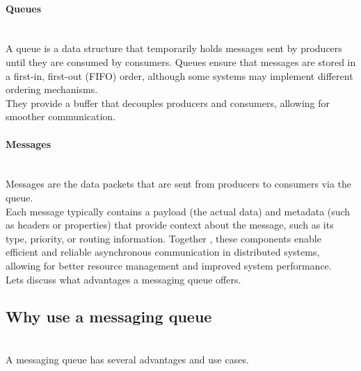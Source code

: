 \paragraph{Queues}\label{Queues}
\\
A queue is a data structure that temporarily holds messages sent by producers until they are consumed by consumers. Queues ensure that messages are stored in a first-in, first-out (FIFO) order, although some systems may implement different ordering mechanisms.
\\
They provide a buffer that decouples producers and consumers, allowing for smoother communication.
\\
\paragraph{Messages}\label{Messages}
\\
Messages are the data packets that are sent from producers to consumers via the queue.
\\
Each message typically contains a payload (the actual data) and metadata (such as headers or properties) that provide context about the message, such as its type, priority, or routing information. Together , these components enable efficient and reliable asynchronous communication in distributed systems, allowing for better resource management and improved system performance.
\\
Let\textquotesingle s discuss what advantages a messaging queue offers.

\subsection{Why use a messaging queue}\label{mXacg0QV42uY6eLkoRbVu}
\\
A messaging queue has several advantages and use cases.

